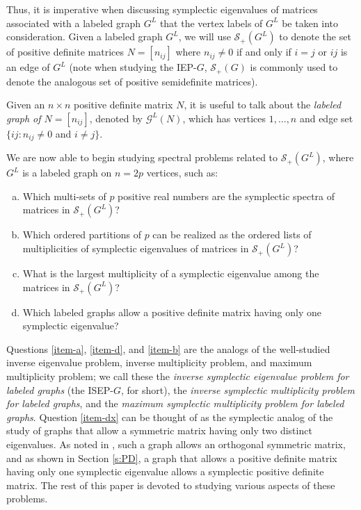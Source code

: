 \documentclass[12pt]{article}
\theoremstyle{definition}
\theoremstyle{definition}
\theoremstyle{definition}
\numberwithin{figure}{section}
\numberwithin{equation}{section}
\newcommand{\GL}[1]{\mathcal{G} ^ #1}
\newcommand{\GLG}{G^L}
\newcommand{\symp}{\mathcal{S}_+}
\newcommand{\Symp}{\mathcal{S}_+(G)}
\newcommand{\x}{\times}
\newcommand{\ben}{\begin{enumerate}}
\newcommand{\een}{\end{enumerate}}
\begin{document}
Thus, it is imperative when discussing 
symplectic eigenvalues of matrices associated with a labeled graph $G^L$ that the vertex labels of $G^L$ be taken into consideration. 
  Given a labeled graph $G^L$, we will use $\symp(\GLG)$ to denote the set of  positive definite matrices  $N=[n_{ij}]$   where $n_{ij}\neq 0$ if and only if  $i=j$ or  $ij$ is an edge of $G^L$ (note when studying the IEP-$G$,  $\Symp$ is commonly used to denote the analogous set of positive semidefinite matrices).







 Given an $n\x n$ positive definite matrix $N$, it is  useful to talk about the \emph{labeled graph of $N=[n_{ij}]$}, denoted by $\GL L(N)$, which has vertices $1,\dots,n$ and edge set $\{ij\colon n_{ij}\neq 0$ and  $i\ne j\}$.   


We are now able to begin studying  spectral problems related to  $\symp(G^L)$, where $G^L$ is a labeled graph on $n=2p$ vertices, such as:
\ben[(a)]
\item\label{item-a} Which multi-sets of $p$ positive real numbers are the symplectic spectra of  {matrices} in  $\symp(G^L)$?
 \item\label{item-d} Which {ordered} partitions  of $p$ can be realized as  the {ordered} lists of  multiplicities of symplectic eigenvalues of {matrices} in  $\symp(G^L)$?
\item\label{item-b} What is the largest multiplicity of a symplectic eigenvalue among the matrices in  $\symp(G^L)$?
\item\label{item-dx}  
Which labeled graphs allow a positive definite matrix having only one symplectic eigenvalue?
\een

 Questions \eqref{item-a}, \eqref{item-d}, and \eqref{item-b} are the analogs of the  well-studied inverse eigenvalue problem, inverse multiplicity problem, and maximum multiplicity problem; 
we call these the \textit{inverse symplectic eigenvalue problem for labeled graphs} (the ISEP-$G$, for short), the \emph{inverse symplectic multiplicity problem for labeled graphs}, and the \emph{maximum symplectic  multiplicity problem for labeled graphs}. 
Question  \eqref{item-dx} can be thought of as the symplectic analog of the study of graphs that allow a symmetric matrix having only two distinct eigenvalues.  As noted in \cite{F+13}, such a graph allows an orthogonal symmetric matrix, and as shown in Section \ref{s:PD}, a graph that allows a positive definite matrix having only one symplectic eigenvalue allows a symplectic positive definite matrix.
The rest of this paper  is devoted to studying various aspects of these problems.  
\end{document}
